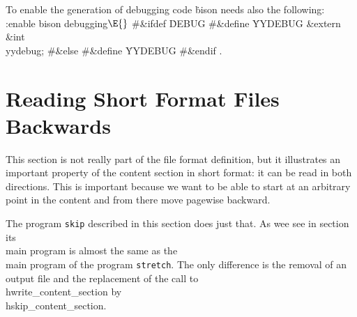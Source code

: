 
To enable the generation of debugging code \.{bison} needs also the following:
\Y\B\4:enable bison debugging\X${}\E{}$\6
\8\#\&{ifdef} \.{DEBUG}\6
\8\#\&{define} \.{YYDEBUG}\5\6
\&{extern} \&{int} \\{yydebug};\6
\8\#\&{else}\6
\8\#\&{define} \.{YYDEBUG}\5\6
\8\#\&{endif}
.\Y
\fi



\appendix

\section{Reading Short Format Files Backwards}
This section is not really part of the file format definition, but it illustrates
an important property of the content section in short format: it can be read in both
directions. This is important because we want to be able
to start at an arbitrary point in the content and from there move pagewise backward.

The program {\tt skip} described in this section does just that. As wee see in section~
its \\{main} program is almost the same as the \\{main} program of the program {\tt stretch}.
The only difference is the removal of an output file and the replacement of the call to
\\{hwrite\_content\_section} by \\{hskip\_content\_section}.

